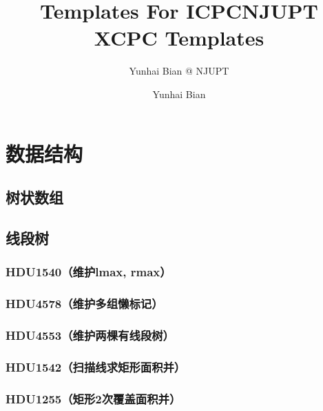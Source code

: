 \documentclass[12pt,a4paper]{article}
\title{Templates For ICPC}
\author{Yunhai Bian @ NJUPT}
\begin{document}
\title{NJUPT XCPC Templates}
\author {Yunhai Bian}
\maketitle
\tableofcontents
\newpage
\section{数据结构}
\subsection{树状数组}

\subsection{线段树}
\subsubsection{HDU1540（维护lmax, rmax）}
\begin{spacing}{1.5}

\end{spacing}

\subsubsection{HDU4578（维护多组懒标记）}
\begin{spacing}{1.5}

\end{spacing}

\subsubsection{HDU4553（维护两棵有线段树）}
\begin{spacing}{1.5}

\end{spacing}

\subsubsection{HDU1542（扫描线求矩形面积并）}
\begin{spacing}{1.5}

\end{spacing}

\subsubsection{HDU1255（矩形2次覆盖面积并）}
\begin{spacing}{1.5}

\end{spacing}

\end{document}
